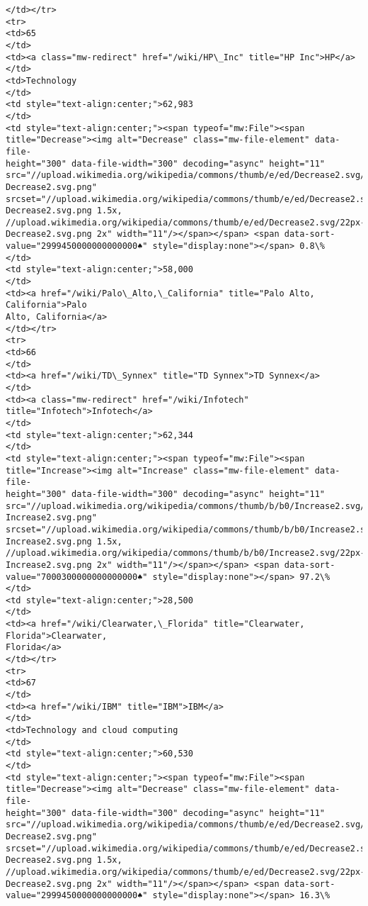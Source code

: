 \documentclass[11pt]{article}
\begin{document}
\begin{Verbatim}[commandchars=\\\{\}]
</td></tr>
<tr>
<td>65
</td>
<td><a class="mw-redirect" href="/wiki/HP\_Inc" title="HP Inc">HP</a>
</td>
<td>Technology
</td>
<td style="text-align:center;">62,983
</td>
<td style="text-align:center;"><span typeof="mw:File"><span
title="Decrease"><img alt="Decrease" class="mw-file-element" data-file-
height="300" data-file-width="300" decoding="async" height="11"
src="//upload.wikimedia.org/wikipedia/commons/thumb/e/ed/Decrease2.svg/11px-
Decrease2.svg.png"
srcset="//upload.wikimedia.org/wikipedia/commons/thumb/e/ed/Decrease2.svg/17px-
Decrease2.svg.png 1.5x,
//upload.wikimedia.org/wikipedia/commons/thumb/e/ed/Decrease2.svg/22px-
Decrease2.svg.png 2x" width="11"/></span></span> <span data-sort-
value="2999450000000000000♠" style="display:none"></span> 0.8\%
</td>
<td style="text-align:center;">58,000
</td>
<td><a href="/wiki/Palo\_Alto,\_California" title="Palo Alto, California">Palo
Alto, California</a>
</td></tr>
<tr>
<td>66
</td>
<td><a href="/wiki/TD\_Synnex" title="TD Synnex">TD Synnex</a>
</td>
<td><a class="mw-redirect" href="/wiki/Infotech" title="Infotech">Infotech</a>
</td>
<td style="text-align:center;">62,344
</td>
<td style="text-align:center;"><span typeof="mw:File"><span
title="Increase"><img alt="Increase" class="mw-file-element" data-file-
height="300" data-file-width="300" decoding="async" height="11"
src="//upload.wikimedia.org/wikipedia/commons/thumb/b/b0/Increase2.svg/11px-
Increase2.svg.png"
srcset="//upload.wikimedia.org/wikipedia/commons/thumb/b/b0/Increase2.svg/17px-
Increase2.svg.png 1.5x,
//upload.wikimedia.org/wikipedia/commons/thumb/b/b0/Increase2.svg/22px-
Increase2.svg.png 2x" width="11"/></span></span> <span data-sort-
value="7000300000000000000♠" style="display:none"></span> 97.2\%
</td>
<td style="text-align:center;">28,500
</td>
<td><a href="/wiki/Clearwater,\_Florida" title="Clearwater, Florida">Clearwater,
Florida</a>
</td></tr>
<tr>
<td>67
</td>
<td><a href="/wiki/IBM" title="IBM">IBM</a>
</td>
<td>Technology and cloud computing
</td>
<td style="text-align:center;">60,530
</td>
<td style="text-align:center;"><span typeof="mw:File"><span
title="Decrease"><img alt="Decrease" class="mw-file-element" data-file-
height="300" data-file-width="300" decoding="async" height="11"
src="//upload.wikimedia.org/wikipedia/commons/thumb/e/ed/Decrease2.svg/11px-
Decrease2.svg.png"
srcset="//upload.wikimedia.org/wikipedia/commons/thumb/e/ed/Decrease2.svg/17px-
Decrease2.svg.png 1.5x,
//upload.wikimedia.org/wikipedia/commons/thumb/e/ed/Decrease2.svg/22px-
Decrease2.svg.png 2x" width="11"/></span></span> <span data-sort-
value="2999450000000000000♠" style="display:none"></span> 16.3\%

\end{Verbatim}
\end{document}
